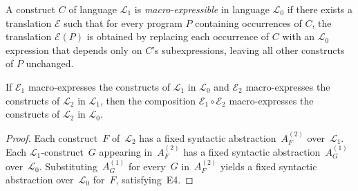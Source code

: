 \begin{definition}
  \label{def:macro-expressibility}
  A construct $C$ of language $\mathscr{L}_1$ is \emph{macro-expressible}
  in language $\mathscr{L}_0$ if there exists a translation $\mathcal{E}$
  such that for every program $P$ containing occurrences of $C$,
  the translation $\mathcal{E}(P)$ is obtained by replacing each
  occurrence of $C$ with an $\mathscr{L}_0$ expression that depends only
  on $C$'s subexpressions, leaving all other constructs of $P$
  unchanged.
\end{definition}

\begin{lemma}
  \label{lem:macro-composition}
  If $\mathcal{E}_1$ macro-expresses the constructs of
  $\mathscr{L}_1$ in $\mathscr{L}_0$ and
  $\mathcal{E}_2$ macro-expresses the constructs of
  $\mathscr{L}_2$ in $\mathscr{L}_1$, then the composition
  $\mathcal{E}_1 \circ \mathcal{E}_2$ macro-expresses the
  constructs of $\mathscr{L}_2$ in $\mathscr{L}_0$.
\end{lemma}

\begin{proof}
  Each construct~$F$ of~$\mathscr{L}_2$ has a fixed
  syntactic abstraction~$A_F^{(2)}$
  over~$\mathscr{L}_1$.
  Each $\mathscr{L}_1$-construct~$G$ appearing
  in~$A_F^{(2)}$ has a fixed
  syntactic abstraction~$A_G^{(1)}$
  over~$\mathscr{L}_0$.
  Substituting~$A_G^{(1)}$ for every~$G$
  in~$A_F^{(2)}$ yields a fixed syntactic
  abstraction over~$\mathscr{L}_0$ for~$F$,
  satisfying~E4.
\end{proof}

